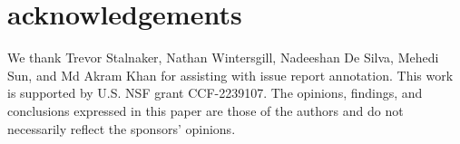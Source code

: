 
\section*{acknowledgements}
We thank Trevor Stalnaker, Nathan Wintersgill, Nadeeshan De Silva, Mehedi Sun, and Md Akram Khan for assisting with issue report annotation. This work is supported by U.S. NSF grant CCF-2239107. The opinions, findings, and conclusions expressed in this paper are those of the authors and do not necessarily reflect the sponsors' opinions.

